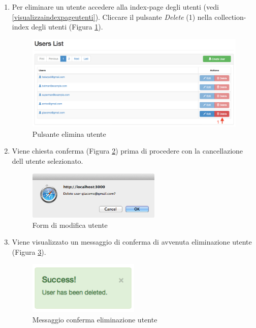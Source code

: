 		\begin{enumerate}

				\item Per eliminare un utente accedere alla index-page degli utenti (vedi \ref{visualizzaindexpageutenti}). Cliccare il pulsante \emph{Delete} (1) nella collection-index degli utenti (Figura \ref{fig:deleteUserButton}).
					\begin{figure}[H]
						\centering \includegraphics[width=1\textwidth]{img/deleteUserButton.png}
						\caption{ \label{fig:deleteUserButton} Pulsante elimina utente}
					\end{figure}

				\item Viene chiesta conferma (Figura \ref{fig:confirmDeleteUser}) prima di procedere con la cancellazione dell utente selezionato.

					\begin{figure}[H]
						\centering \includegraphics[width=0.6\textwidth]{img/confirmDeleteUser.png}
						\caption{ \label{fig:confirmDeleteUser} Form di modifica utente}
					\end{figure}

				\item Viene visualizzato un messaggio di conferma di avvenuta eliminazione utente (Figura \ref{fig:messageDeletedUser}).

					\begin{figure}[H]
						\centering \includegraphics[width=0.5\textwidth]{img/messageDeletedUser.png}
						\caption{ \label{fig:messageDeletedUser} Messaggio conferma eliminazione utente}
					\end{figure}

			\end{enumerate}  
		